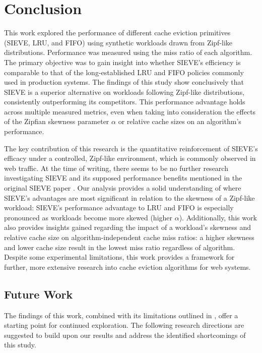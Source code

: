 \chapter{Conclusion}\label{chapter:conclusion}


This work explored the performance of different cache eviction primitives (SIEVE, LRU, and FIFO) using synthetic workloads drawn from Zipf-like distributions. Performance was measured using the miss ratio of each algorithm. The primary objective was to gain insight into whether SIEVE's efficiency is comparable to that of the long-established LRU and FIFO policies commonly used in production systems. The findings of this study show conclusively that SIEVE is a superior alternative on workloads following Zipf-like distributions, consistently outperforming its competitors. This performance advantage holds across multiple measured metrics, even when taking into consideration the effects of the Zipfian skewness parameter $\alpha$ or relative cache sizes on an algorithm's performance. 

The key contribution of this research is the quantitative reinforcement of SIEVE's efficacy under a controlled, Zipf-like environment, which is commonly observed in web traffic. At the time of writing, there seems to be no further research investigating SIEVE and its supposed performance benefits mentioned in the original SIEVE paper \cite{sieve}. Our analysis provides a solid understanding of where SIEVE's advantages are most significant in relation to the skewness of a Zipf-like workload: SIEVE's performance advantage to LRU and FIFO is especially pronounced as workloads become more skewed (higher $\alpha$). Additionally, this work also provides insights gained regarding the impact of a workload's skewness and relative cache size on algorithm-independent cache miss ratios: a higher skewness and lower cache size result in the lowest miss ratio regardless of algorithm. Despite some experimental limitations, this work provides a framework for further, more extensive research into cache eviction algorithms for web systems.

\section{Future Work}
The findings of this work, combined with its limitations outlined in , offer a starting point for continued exploration. The following research directions are suggested to build upon our results and address the identified shortcomings of this study.


